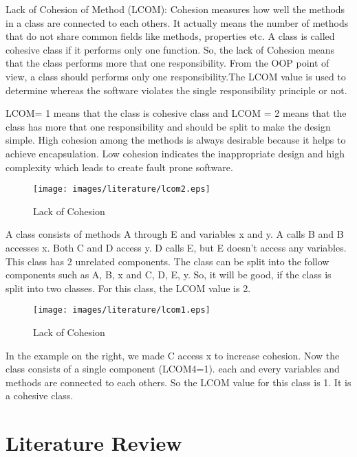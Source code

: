 \documentclass[12pt]{report}
\begin{document}
Lack of Cohesion of Method (LCOM): 
Cohesion measures how well the methods in a class are connected to each others. It actually means the number of methods that do not share common fields like methods, properties etc. A class is called cohesive class if it performs only one function. So, the lack of Cohesion means that the class performs more that one responsibility. From the OOP point of view, a class should performs only one responsibility.The LCOM value is used to determine whereas the software violates the single responsibility principle or not. 

LCOM= 1 means that the class is cohesive class and LCOM \gt= 2 means that the class has more that one responsibility and should be split to make the design simple. High cohesion among the methods is always desirable because it helps to achieve encapsulation. Low cohesion indicates the inappropriate design and high complexity which leads to create fault prone software.   

\begin{figure}[h!]
  \centering
    \texttt{[image: images/literature/lcom2.eps]}
		\caption{Lack of Cohesion}
		\label{lcom2}
\end{figure}
A class consists of methods A through E and variables x and y. A calls B and B accesses x. Both C and D access y. D calls E, but E doesn't access any variables. This class has 2 unrelated components. The class can be split into the follow components such as {A, B, x} and {C, D, E, y}. So, it will be good, if the class is split into two classes. For this class, the LCOM value is 2. 
\begin{figure}[h!]
  \centering
    \texttt{[image: images/literature/lcom1.eps]}
		\caption{Lack of Cohesion}
		\label{lcom1}
\end{figure}
In the example on the right, we made C access x to increase cohesion. Now the class consists of a single component (LCOM4=1). each and every variables and methods are connected to each others. So the LCOM value for this class is 1. It is a cohesive class. 


\chapter{Literature Review}
\end{document}
